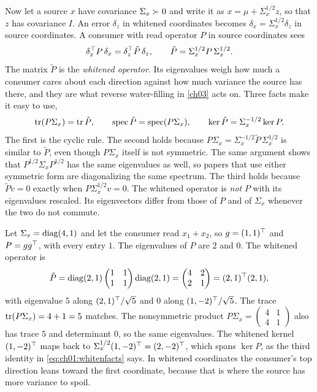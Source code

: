 Now let a source $x$ have covariance $\Sigma_x\succ0$ and write it as
$x=\mu+\Sigma_x^{1/2}z$, so that $z$ has covariance $I$. An error $\delta_z$ in
whitened coordinates becomes $\delta_x=\Sigma_x^{1/2}\delta_z$ in source
coordinates. A consumer with read operator $P$ in source coordinates sees
\begin{equation}\label{eq:ch01:whitenedop}
\delta_x^{\top} P\,\delta_x=\delta_z^{\top}\tilde P\,\delta_z,\qquad \tilde P=\Sigma_x^{1/2}P\,\Sigma_x^{1/2}.
\end{equation}
The matrix $\tilde P$ is the \emph{whitened operator}. Its eigenvalues weigh
how much a consumer cares about each direction against how much variance the
source has there, and they are what reverse water-filling in \cref{ch03} acts on.
Three facts make it easy to use,
\begin{equation}\label{eq:ch01:whitenfacts}
\operatorname{tr}(P\Sigma_x)=\operatorname{tr}\tilde P,\qquad
\operatorname{spec}\tilde P=\operatorname{spec}(P\Sigma_x),\qquad
\operatorname{ker}\tilde P=\Sigma_x^{-1/2}\operatorname{ker} P .
\end{equation}
The first is the cyclic rule. The second holds because
$P\Sigma_x=\Sigma_x^{-1/2}\tilde P\,\Sigma_x^{1/2}$ is similar to $\tilde P$,
even though $P\Sigma_x$ itself is not symmetric. The same argument shows that
$P^{1/2}\Sigma_xP^{1/2}$ has the same eigenvalues as well, so papers that use
either symmetric form are diagonalizing the same spectrum. The third holds
because $\tilde Pv=0$ exactly when $P\Sigma_x^{1/2}v=0$. The whitened operator
is \emph{not} $P$ with its eigenvalues rescaled. Its eigenvectors differ from
those of $P$ and of $\Sigma_x$ whenever the two do not commute.

\begin{example}\label{ex:ch01:whiten}
Let $\Sigma_x=\operatorname{diag}(4,1)$ and let the consumer read $x_1+x_2$, so $g=(1,1)^{\top}$
and $P=gg^{\top}$, with every entry $1$. The eigenvalues of $P$ are $2$ and $0$. The
whitened operator is
\[
\tilde P=\operatorname{diag}(2,1)\begin{pmatrix}1&1\\1&1\end{pmatrix}\operatorname{diag}(2,1)
=\begin{pmatrix}4&2\\2&1\end{pmatrix}=(2,1)^{\top}(2,1),
\]
with eigenvalue $5$ along $(2,1)^{\top}/\sqrt5$ and $0$ along $(1,-2)^{\top}/\sqrt5$.
The trace $\operatorname{tr}(P\Sigma_x)=4+1=5$ matches. The nonsymmetric product
$P\Sigma_x=\begin{pmatrix}4&1\\4&1\end{pmatrix}$ also has trace $5$ and
determinant $0$, so the same eigenvalues. The whitened kernel
$(1,-2)^{\top}$ maps back to $\Sigma_x^{1/2}(1,-2)^{\top}=(2,-2)^{\top}$, which spans
$\ker P$, as the third identity in \cref{eq:ch01:whitenfacts} says. In whitened
coordinates the consumer's top direction leans toward the first coordinate,
because that is where the source has more variance to spoil.
\end{example}

